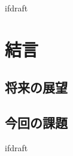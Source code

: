 \expandafter\ifx\csname ifdraft\endcsname\relax
 
\fi

\section{結言}

\subsection{将来の展望}

\subsection{今回の課題}

\expandafter\ifx\csname ifdraft\endcsname\relax
  
\fi
